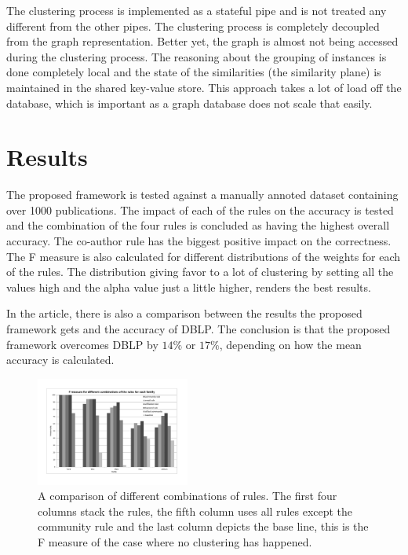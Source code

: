 \documentclass[9pt, twocolumn]{phdsymp} %
\begin{document}
The clustering process is implemented as a stateful pipe and is not treated any different from the other pipes. The clustering process is completely decoupled from the graph representation. Better yet, the graph is almost not being accessed during the clustering process. The reasoning about the grouping of instances is done completely local and the state of the similarities (the similarity plane) is maintained in the shared key-value store. This approach takes a lot of load off the database, which is important as a graph database does not scale that easily.

\section{Results}

The proposed framework is tested against a manually annoted dataset containing over 1000 publications. The impact of each of the rules on the accuracy is tested and the combination of the four rules is concluded as having the highest overall accuracy. The co-author rule has the biggest positive impact on the correctness. The F measure is also calculated for different distributions of the weights for each of the rules. The distribution giving favor to a lot of clustering by setting all the values high and the alpha value just a little higher, renders the best results. 

In the article, there is also a comparison between the results the proposed framework gets and the accuracy of DBLP. The conclusion is that the proposed framework overcomes DBLP by $14\%$ or $17\%$, depending on how the mean accuracy is calculated.


\begin{figure}[htpb!]
\centering
\includegraphics[width= 0.45\textwidth]{fig/test-rules.pdf}
\caption{A comparison of different combinations of rules. The first four columns stack the rules, the fifth column uses all rules except the community rule and the last column depicts the base line, this is the F measure of the case where no clustering has happened.}
\label{fig:testperformance}
\end{figure}
\end{document}
